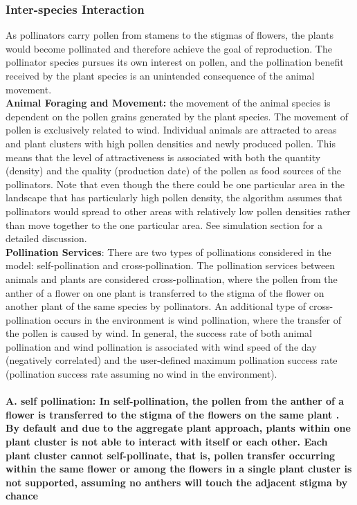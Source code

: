 \documentclass[3p,,preprint,12pt]{elsarticle}
\begin{document}
\subsubsection{Inter-species Interaction}
As pollinators carry pollen from stamens to the stigmas of flowers, the plants would become pollinated and therefore achieve the goal of reproduction. The pollinator species pursues its own interest on pollen, and the pollination benefit received by the plant species is an unintended consequence of the animal movement.\\

\noindent\textbf{Animal Foraging and Movement:} the movement of the animal species is dependent on the pollen grains generated by the plant species. The movement of pollen is exclusively related to wind. Individual animals are attracted to areas and plant clusters with high pollen densities and newly produced pollen. This means that the level of attractiveness is associated with both the quantity (density) and the quality (production date) of the pollen as food sources of the pollinators. Note that even though the there could be one particular area in the landscape that has particularly high pollen density, the algorithm assumes that pollinators would spread to other areas with relatively low pollen densities rather than move together to the one particular area. See simulation section for a detailed discussion.\\

\noindent\textbf{Pollination Services}: There are two types of pollinations considered in the model: self-pollination and cross-pollination. The pollination services between animals and plants are considered cross-pollination, where the pollen from the anther of a flower on one plant is transferred to the stigma of the flower on another plant of the same species by pollinators. An additional type of cross-pollination occurs in the environment is wind pollination, where the transfer of the pollen is caused by wind. In general, the success rate of both animal pollination and wind pollination is associated with wind speed of the day (negatively correlated) and the user-defined maximum pollination success rate (pollination success rate assuming no wind in the environment).

\paragraph{\textbf{A. self pollination}: In self-pollination, the pollen from the anther of a flower is transferred to the stigma of the flowers on the same plant \cite{doi:10.1086/418432}. By default and due to the aggregate plant approach, plants within one plant cluster is not able to interact with itself or each other. Each plant cluster cannot self-pollinate, that is, pollen transfer occurring within the same flower or among the flowers in a single plant cluster is not supported, assuming no anthers will touch the adjacent stigma by chance}
\end{document}
